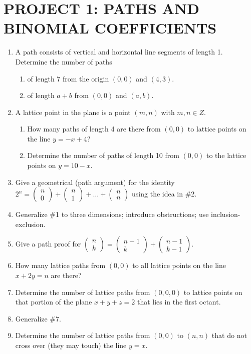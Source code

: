 \documentclass{article}
\begin{document}
\section[PROJECT 1: PATHS AND BINOMIAL COEFFICIENTS]{PROJECT 1: PATHS AND BINOMIAL COEFFICIENTS}
\begin{enumerate}
\item A path consists of vertical and horizontal line segments of length 1. Determine the number of paths

\begin{enumerate}
\item of length 7 from the origin $\left(0,0\right)$ and  $(4,3)$.
\item of length  $a+b$ from  $\left(0,0\right)$ and  $(a,b)$.
\end{enumerate}
\item A lattice point in the plane is a point  $(m,n)$ with  $m,n{\in}Z$.

\begin{enumerate}
\item How many paths of length 4 are there from  $(0,0)$ to lattice points on the line  $y=-x+4$? 
\item Determine the number of paths of length 10 from  $(0,0)$ to the lattice points on  $y=10-x$.
\end{enumerate}
\item Give a geometrical (path argument) for the identity 
$2^n=\left(\begin{matrix}n\\0\end{matrix}\right)+\left(\begin{matrix}n\\1\end{matrix}\right)+{\dots}+\left(\begin{matrix}n\\n\end{matrix}\right)$
using the idea in \#2. 
\item Generalize \#1 to three dimensions; introduce obstructions; use inclusion-exclusion. 
\item Give a path proof for 
$\left(\begin{matrix}n\\k\end{matrix}\right)=\left(\begin{matrix}n-1\\k\end{matrix}\right)+\left(\begin{matrix}n-1\\k-1\end{matrix}\right)$.

\item How many lattice paths from  $\left(0,0\right)$ to all lattice points on the line  $x+2y=n$ are there?
\item Determine the number of lattice paths from  $\left(0,0,0\right)$ to lattice points on that portion of the plane 
$x+y+z=2$ that lies in the first octant. 
\item Generalize \#7.
\item Determine the number of lattice paths from  $\left(0,0\right)$ to  $(n,n)$ that do not cross over (they may touch)
the line $y=x$.
\end{enumerate}
\end{document}
